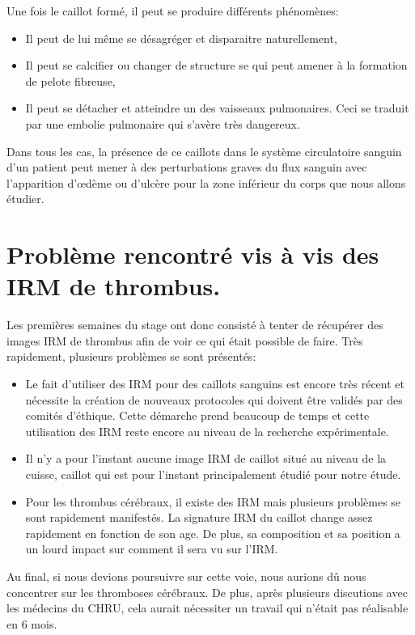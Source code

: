 Une fois le caillot formé, il peut se produire différents phénomènes:

\begin{itemize}
\item Il peut de lui même se désagréger et disparaitre naturellement,
\item Il peut se calcifier ou changer de structure se qui peut amener à la formation de pelote fibreuse,
\item Il peut se détacher et atteindre un des vaisseaux pulmonaires. Ceci se traduit par une embolie pulmonaire qui s'avère très dangereux.
\end{itemize}

Dans tous les cas, la présence de ce caillots dans le système circulatoire sanguin d'un patient peut mener à des perturbations graves du flux sanguin avec l'apparition d'œdème ou d'ulcère pour la zone inférieur du corps que nous allons étudier.

\section{Problème rencontré vis à vis des IRM de thrombus.}

Les premières semaines du stage ont donc consisté à tenter de récupérer des images IRM de thrombus afin de voir ce qui était possible de faire. Très rapidement, plusieurs problèmes se sont présentés:

\begin{itemize}
\item Le fait d'utiliser des IRM pour des caillots sanguins est encore très récent et nécessite la création de nouveaux protocoles qui doivent être validés par des comités d'éthique. Cette démarche prend beaucoup de temps et cette utilisation des IRM reste encore au niveau de la recherche expérimentale.
\item Il n'y a pour l'instant aucune image IRM de caillot situé au niveau de la cuisse, caillot qui est pour l'instant principalement étudié pour notre étude.
\item Pour les thrombus cérébraux, il existe des IRM mais plusieurs problèmes se sont rapidement manifestés. La signature IRM du caillot change assez rapidement en fonction de son age. De plus, sa composition et sa position a un lourd impact sur comment il sera vu sur l'IRM.
\end{itemize}

Au final, si nous devions poursuivre sur cette voie, nous aurions dû nous concentrer sur les thromboses cérébraux. De plus, après plusieurs discutions avec les médecins du CHRU, cela aurait nécessiter un travail qui n'était pas réalisable en 6 mois.

